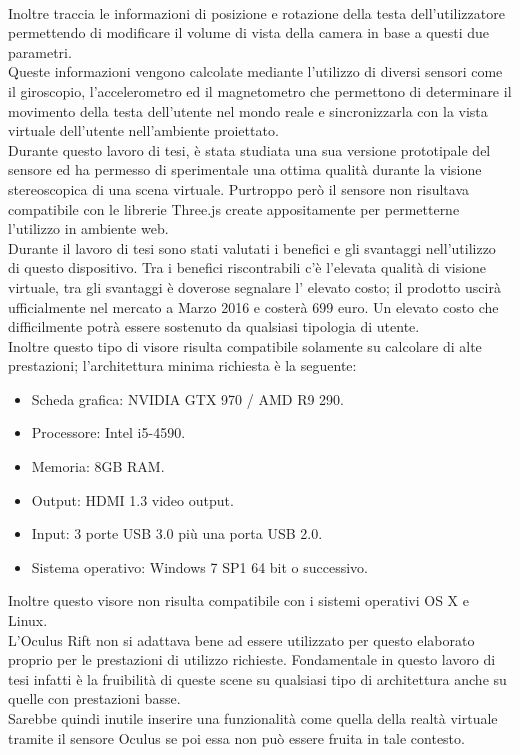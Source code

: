 \\
Inoltre traccia le informazioni di posizione e rotazione della testa dell’utilizzatore permettendo di modificare il volume di vista della camera in base a questi due parametri.
\\
Queste informazioni vengono calcolate mediante l’utilizzo di diversi sensori come il giroscopio, l’accelerometro ed il magnetometro che permettono di determinare il movimento della testa dell’utente nel mondo reale e sincronizzarla con la vista virtuale dell’utente nell’ambiente proiettato.
\\
Durante questo lavoro di tesi, è stata studiata una sua versione prototipale del sensore ed ha permesso di sperimentale una ottima qualità durante la visione stereoscopica di una scena virtuale. Purtroppo però il sensore non risultava compatibile con le librerie Three.js create appositamente per permetterne l'utilizzo in ambiente web.
\\
Durante il lavoro di tesi sono stati valutati i benefici e gli svantaggi nell’utilizzo di questo dispositivo. Tra i benefici riscontrabili c’è l’elevata qualità di visione virtuale, tra gli svantaggi è doverose segnalare l’ elevato costo; il prodotto uscirà ufficialmente nel mercato a Marzo 2016 e costerà 699 euro.
Un elevato costo che difficilmente potrà essere sostenuto da qualsiasi tipologia di utente.
\\
Inoltre questo tipo di visore risulta compatibile solamente su calcolare di alte prestazioni; l’architettura minima richiesta è la seguente:
\begin{itemize}
\item Scheda grafica: NVIDIA GTX 970 / AMD R9 290.
\item Processore: Intel i5-4590.
\item Memoria: 8GB RAM.
\item Output: HDMI 1.3 video output.
\item Input: 3 porte USB 3.0 più una porta USB 2.0.
\item Sistema operativo: Windows 7 SP1 64 bit o successivo.
\end{itemize}
Inoltre questo visore non risulta compatibile con i sistemi operativi OS X e Linux.
\\
L’Oculus Rift non si adattava bene ad essere utilizzato per questo elaborato proprio per le prestazioni di utilizzo richieste. Fondamentale in questo lavoro di tesi infatti è la fruibilità di queste scene su qualsiasi tipo di architettura anche su quelle con prestazioni basse.
\\
Sarebbe quindi inutile inserire una funzionalità come quella della realtà virtuale tramite il sensore Oculus se poi  essa non può essere fruita in tale contesto.
\\

